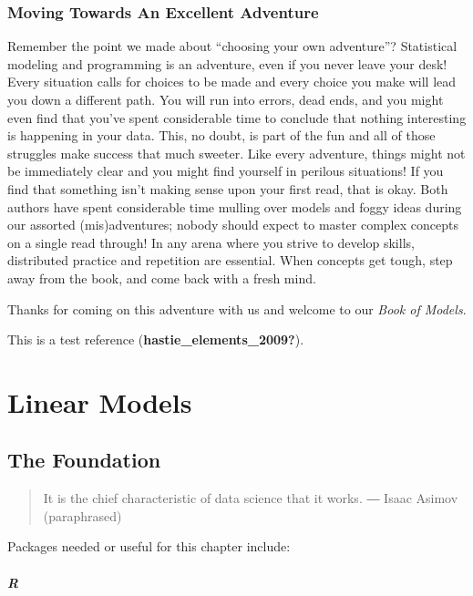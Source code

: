 \documentclass[
  letterpaper,
]{krantz}
\begin{document}
\section{Moving Towards An Excellent
Adventure}\label{moving-towards-an-excellent-adventure}

Remember the point we made about ``choosing your own adventure''?
Statistical modeling and programming is an adventure, even if you never
leave your desk! Every situation calls for choices to be made and every
choice you make will lead you down a different path. You will run into
errors, dead ends, and you might even find that you've spent
considerable time to conclude that nothing interesting is happening in
your data. This, no doubt, is part of the fun and all of those struggles
make success that much sweeter. Like every adventure, things might not
be immediately clear and you might find yourself in perilous situations!
If you find that something isn't making sense upon your first read, that
is okay. Both authors have spent considerable time mulling over models
and foggy ideas during our assorted (mis)adventures; nobody should
expect to master complex concepts on a single read through! In any arena
where you strive to develop skills, distributed practice and repetition
are essential. When concepts get tough, step away from the book, and
come back with a fresh mind.

Thanks for coming on this adventure with us and welcome to our
\emph{Book of Models}.

This is a test reference (\textbf{hastie\_elements\_2009?}).

\part{Linear Models}

\chapter{The Foundation}\label{the-foundation}

\begin{quote}
It is the chief characteristic of data science that it works. ― Isaac
Asimov (paraphrased)
\end{quote}

Packages needed or useful for this chapter include:

\subsubsection{R}
\end{document}
